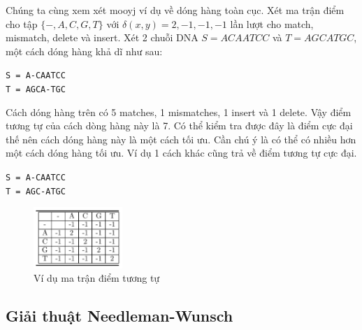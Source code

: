 Chúng ta cùng xem xét mooyj ví dụ về dóng hàng toàn cục. Xét ma trận điểm cho tập 
$\{-, A, C, G, T\}$ với $\delta(x, y) = 2, -1, -1, -1$ lần lượt cho match, mismatch, 
delete và insert. Xét 2 chuỗi DNA $S = ACAATCC$ và $T = AGCATGC$, một cách dóng hàng
khả dĩ như sau:
\begin{center}
    \lstinline{S = A-CAATCC} \\
    \lstinline{T = AGCA-TGC}
\end{center}
Cách dóng hàng trên có 5 matches, 1 mismatches, 1 insert và 1 delete. Vậy điểm tương tự của 
cách dòng hàng này là 7. Có thể kiểm tra được đây là điểm cực đại thế nên cách dóng hàng
này là một cách tối ưu. Cần chú ý là có thể có nhiều hơn một cách dóng hàng tối ưu. 
Ví dụ 1 cách khác cũng trả về điểm tương tự cực đại.
\begin{center}
    \lstinline{S = A-CAATCC} \\
    \lstinline{T = AGC-ATGC}
\end{center}

\begin{figure}[H] %
    \centering %
    \includegraphics[width=0.3\textwidth]{./assets/score_matrix.png} 
    \caption{Ví dụ ma trận điểm tương tự} %
\end{figure}

\subsection{Giải thuật Needleman-Wunsch}
